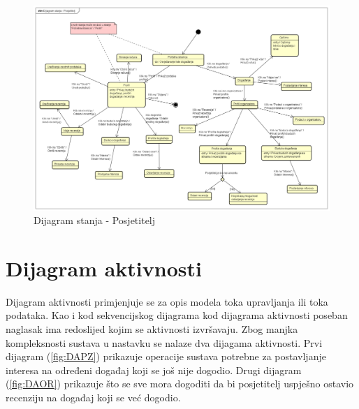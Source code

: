 			\begin{figure}[H]
			\includegraphics[width=\textwidth]{slike/Dijagram stanja - Posjetitelj.PNG} %
			\caption{Dijagram stanja - Posjetitelj}
			\label{fig:DSP} %
		\end{figure}
			
			
			\eject 
		
		\section{Dijagram aktivnosti}
		
			Dijagram aktivnosti primjenjuje se za opis modela toka upravljanja ili toka podataka. Kao i kod sekvencijskog dijagrama kod dijagrama aktivnosti poseban naglasak ima redoslijed kojim se aktivnosti izvršavaju. Zbog manjka kompleksnosti sustava u nastavku se nalaze dva dijagama aktivnosti. Prvi dijagram (\ref{fig:DAPZ}) prikazuje operacije sustava potrebne za postavljanje interesa na određeni događaj koji se još nije dogodio. Drugi dijagram (\ref{fig:DAOR}) prikazuje što se sve mora dogoditi da bi posjetitelj uspješno ostavio recenziju na događaj koji se već dogodio. 
			
